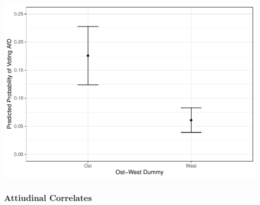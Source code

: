 \documentclass[
]{article}
\begin{document}
\includegraphics{AVCD_Final_Assignment-Edenhofer_files/figure-latex/afd-ost-west-1.pdf}

\hypertarget{attiudinal-correlates-2}{%
\subsubsection{Attiudinal Correlates}\label{attiudinal-correlates-2}}
\end{document}

